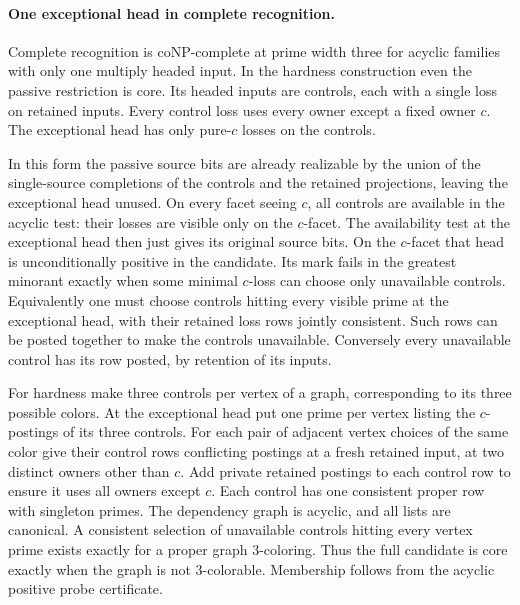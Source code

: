 \paragraph{One exceptional head in complete recognition.}
Complete recognition is coNP-complete at prime width
three for acyclic families with only one multiply
headed input. In the hardness construction even the
passive restriction is core. Its headed inputs are
controls, each with a single loss on retained inputs.
Every control loss uses every owner except a fixed
owner $c$. The exceptional head has only pure-$c$
losses on the controls.

In this form the passive source bits are already
realizable by the union of the single-source
completions of the controls and the retained
projections, leaving the exceptional head unused.
On every facet seeing $c$, all controls are
available in the acyclic test: their losses are
visible only on the $c$-facet. The availability
test at the exceptional head then just gives
its original source bits. On the $c$-facet
that head is unconditionally positive in the
candidate. Its mark fails in the greatest
minorant exactly when some minimal $c$-loss
can choose only unavailable controls. Equivalently
one must choose controls hitting every visible
prime at the exceptional head, with their
retained loss rows jointly consistent. Such
rows can be posted together to make the
controls unavailable. Conversely every
unavailable control has its row posted, by
retention of its inputs.

For hardness make three controls per vertex of
a graph, corresponding to its three possible
colors. At the exceptional head put one prime
per vertex listing the $c$-postings of its
three controls. For each pair of adjacent
vertex choices of the same color give their
control rows conflicting postings at a fresh
retained input, at two distinct owners other
than $c$. Add private retained postings to
each control row to ensure it uses all owners
except $c$. Each control has one consistent
proper row with singleton primes. The
dependency graph is acyclic, and all lists
are canonical. A consistent selection of
unavailable controls hitting every vertex
prime exists exactly for a proper graph
$3$-coloring. Thus the full candidate is core
exactly when the graph is not $3$-colorable.
Membership follows from the acyclic positive
probe certificate.

